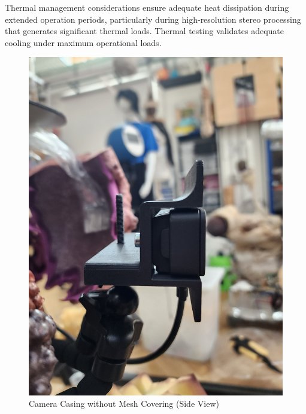 Thermal management considerations ensure adequate heat dissipation during extended operation periods, particularly during high-resolution stereo processing that generates significant thermal loads. Thermal testing validates adequate cooling under maximum operational loads.

\begin{figure}[H]
    \centering
    \begin{minipage}{0.45\textwidth}
        \centering
        \includegraphics[width=\textwidth, angle=-90]{Images/CameraCasingNoMesh (4).jpg}
        \caption{Camera Casing without Mesh Covering (Side View)}
        \label{fig:camera_casing_no_mesh_side}
    \end{minipage}
    \hfill
    \begin{minipage}{0.45\textwidth}
        \centering

\end{minipage}
\end{figure}
